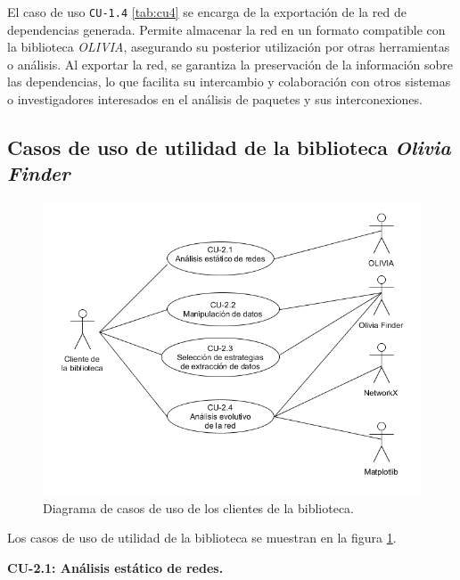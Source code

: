 El caso de uso \texttt{CU-1.4} \ref{tab:cu4} se encarga de la exportación de la red de dependencias generada. Permite
almacenar la red en un formato compatible con la biblioteca \textit{OLIVIA}, asegurando su posterior utilización por
otras herramientas o análisis. Al exportar la red, se garantiza la preservación de la información sobre las
dependencias, lo que facilita su intercambio y colaboración con otros sistemas o investigadores interesados
en el análisis de paquetes y sus interconexiones.

\subsection{Casos de uso de utilidad de la biblioteca \textit{Olivia Finder}}

\begin{figure}[ht!]
	\centering
	\includegraphics[width=1\textwidth]{img/anexos/CU_notebooks.png}
	\caption{Diagrama de casos de uso de los clientes de la biblioteca.}
	\label{fig:casos_de_uso_notebooks}
\end{figure}

Los casos de uso de utilidad de la biblioteca se muestran en la figura \ref{fig:casos_de_uso_notebooks}.


\textbf{CU-2.1: Análisis estático de redes.}

